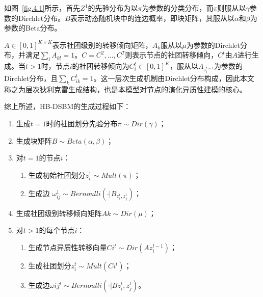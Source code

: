 如图~\ref{fig.4.1}所示，首先$Z^1$的先验分布为以$\pi$为参数的分类分布，而$\pi$则服从以$\gamma$参数的Dirchlet分布。$B$表示动态随机块中的连边概率，即块矩阵，其服从以$\alpha$和$\beta$为参数的Beta分布。

$A \in [0, 1]^{K \times K}$表示社团级别的转移倾向矩阵，$A_k$服从以$\mu$为参数的Dirchlet分布，并满足$\sum_l A_{kl} = 1$。$C = { C^2, \dots, C^T }$则表示节点的社团转移倾向，$C^t$由$A$进行生成。当$t>1$时，节点$i$的社团转移倾向为$C_i^t \in [0, 1]^K$，服从以$A_{z_i^{t-1}}$为参数的Dirchlet分布，且$\sum_{k} C_{ik}^t = 1$。这一层次生成机制由Dirchlet分布构成，因此本文称之为层次狄利克雷生成结构，也是本模型对节点的演化异质性建模的核心。

综上所述，HB-DSBM的生成过程如下：
\begin{enumerate}
\item  生成$t=1$时的社团划分先验分布${\pi} \sim Dir({\gamma})$；
\item 生成块矩阵$B \sim Beta({\alpha}, {\beta})$；
\item 对$t=1$的节点$i$：
\begin{enumerate}
\item 生成初始社团划分$z_i^1 \sim Mult({\pi})$；
\item 生成边 $\omega_{ij}^1 \sim Bernoulli(\cdot | B_{z_i^1, z_j^1})$；
\end{enumerate}
\item 生成社团级别转移倾向矩阵${A}k \sim Dir({\mu})$；
\item 对$t>1$的每个节点$i$：
\begin{enumerate}
\item 生成节点异质性转移向量${C}i^t \sim Dir({A}{z_i^{t-1}})$；
\item 生成社团划分$z_i^t \sim Mult({C}i^t)$；
\item 生成边$\omega{ij}^t \sim Bernoulli(\cdot | B{z_i^t, z_j^t})$。
\end{enumerate}
\end{enumerate}





